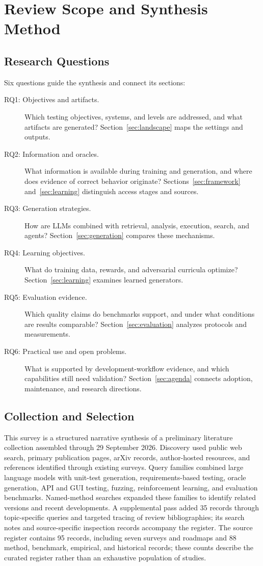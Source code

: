 \section{Review Scope and Synthesis Method}
\label{sec:scope}
\subsection{Research Questions}
Six questions guide the synthesis and connect its sections:
\begin{description}
\item[RQ1: Objectives and artifacts.] Which testing objectives, systems, and levels are addressed, and what artifacts are generated? Section~\ref{sec:landscape} maps the settings and outputs.
\item[RQ2: Information and oracles.] What information is available during training and generation, and where does evidence of correct behavior originate? Sections~\ref{sec:framework} and~\ref{sec:learning} distinguish access stages and sources.
\item[RQ3: Generation strategies.] How are LLMs combined with retrieval, analysis, execution, search, and agents? Section~\ref{sec:generation} compares these mechanisms.
\item[RQ4: Learning objectives.] What do training data, rewards, and adversarial curricula optimize? Section~\ref{sec:learning} examines learned generators.
\item[RQ5: Evaluation evidence.] Which quality claims do benchmarks support, and under what conditions are results comparable? Section~\ref{sec:evaluation} analyzes protocols and measurements.
\item[RQ6: Practical use and open problems.] What is supported by development-workflow evidence, and which capabilities still need validation? Section~\ref{sec:agenda} connects adoption, maintenance, and research directions.
\end{description}

\subsection{Collection and Selection}
This survey is a structured narrative synthesis of a preliminary literature collection assembled through 29 September 2026. Discovery used public web search, primary publication pages, arXiv records, author-hosted resources, and references identified through existing surveys. Query families combined large language models with unit-test generation, requirements-based testing, oracle generation, API and GUI testing, fuzzing, reinforcement learning, and evaluation benchmarks. Named-method searches expanded these families to identify related versions and recent developments. A supplemental pass added 35 records through topic-specific queries and targeted tracing of review bibliographies; its search notes and source-specific inspection records accompany the register. The source register contains 95 records, including seven surveys and roadmaps and 88 method, benchmark, empirical, and historical records; these counts describe the curated register rather than an exhaustive population of studies.

